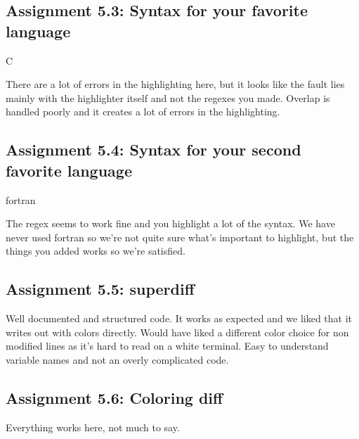 \documentclass[a4paper]{article}
\begin{document}
\subsection*{Assignment 5.3: Syntax for your favorite language}
C

\vspace{5mm}

\noindent There are a lot of errors in the highlighting here, but it looks like the fault lies mainly with the highlighter itself and not the regexes you made. Overlap is handled poorly and it creates a lot of errors in the highlighting.

\subsection*{Assignment 5.4: Syntax for your second favorite language}
fortran

\vspace{5mm}

\noindent The regex seems to work fine and you highlight a lot of the syntax. We have never used fortran so we're not quite sure what's important to highlight, but the things you added works so we're satisfied.

\subsection*{Assignment 5.5: superdiff}

Well documented and structured code. It works as expected and we liked that it writes out with colors directly. Would have liked a different color choice for non modified lines as it's hard to read on a white terminal. Easy to understand variable names and not an overly complicated code. 

\subsection*{Assignment 5.6:  Coloring diff}
Everything works here, not much to say.



\end{document}
